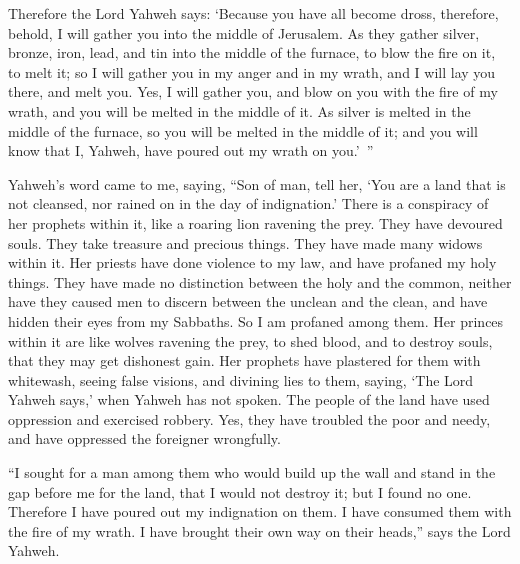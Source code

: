 {Therefore the Lord Yahweh says: ‘Because you have all become dross, therefore, behold, I will gather you into the middle of Jerusalem.
As they gather silver, bronze, iron, lead, and tin into the middle of the furnace, to blow the fire on it, to melt it; so I will gather you in my anger and in my wrath, and I will lay you there, and melt you.
Yes, I will gather you, and blow on you with the fire of my wrath, and you will be melted in the middle of it.
As silver is melted in the middle of the furnace, so you will be melted in the middle of it; and you will know that I, Yahweh, have poured out my wrath on you.’ ”
\par }{\PP {}Yahweh’s word came to me, saying,
“Son of man, tell her, ‘You are a land that is not cleansed, nor rained on in the day of indignation.’
There is a conspiracy of her prophets within it, like a roaring lion ravening the prey. They have devoured souls. They take treasure and precious things. They have made many widows within it.
Her priests have done violence to my law, and have profaned my holy things. They have made no distinction between the holy and the common, neither have they caused men to discern between the unclean and the clean, and have hidden their eyes from my Sabbaths. So I am profaned among them.
Her princes within it are like wolves ravening the prey, to shed blood, and to destroy souls, that they may get dishonest gain.
Her prophets have plastered for them with whitewash, seeing false visions, and divining lies to them, saying, ‘The Lord Yahweh says,’ when Yahweh has not spoken.
The people of the land have used oppression and exercised robbery. Yes, they have troubled the poor and needy, and have oppressed the foreigner wrongfully.
\par }{\PP {}“I sought for a man among them who would build up the wall and stand in the gap before me for the land, that I would not destroy it; but I found no one.
Therefore I have poured out my indignation on them. I have consumed them with the fire of my wrath. I have brought their own way on their heads,” says the Lord Yahweh.

}
